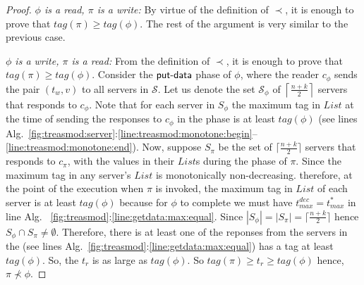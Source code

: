 \begin{proof}
\emph{ $\phi$ is a read, $\pi$ is a write:}
By virtue of the definition of $\prec$, it is enough to prove that $tag(\pi) \geq tag(\phi)$.  The rest of the argument is very similar to the previous case.

\emph{ $\phi$ is a write, $\pi$ is a read:}
From  the definition of $\prec$, it is enough to prove that $tag(\pi) \geq tag(\phi)$. Consider the $\act{put-data}$ phase of $\phi$, where the reader $c_{\phi}$ sends the pair $(t_w, v)$ to all 
servers in $\mathcal{S}$. Let us denote the  set $\mathcal{S}_{\phi}$ of $\left\lceil \frac{n+k}{2} \right\rceil$ servers  that responds to $c_{\phi}$.  Note that for each server in $S_{\phi}$ the maximum tag in $List$ at the time of 
sending the responses to $c_{\phi}$ in the   phase is at least $tag(\phi)$ 
(see  lines 
Alg.~\ref{fig:treasmod:server}:\ref{line:treasmod:monotone:begin}--\ref{line:treasmod:monotone:end}). 
%
Now, suppose $S_{\pi}$ be 
the set of $\lceil \frac{n+k}{2} \rceil$ servers that responds to $c_{\pi}$, with the values in their
 $List$s  during the  phase of $\pi$. 
Since the maximum tag in any server's $List$ is monotonically non-decreasing.%
therefore, at the point of the execution when $\pi$ is invoked, the maximum
tag in  $List$ of each server is at least $tag(\phi)$ because for $\phi$ to complete we must have 
$t_{max}^{dec} =  t_{max}^{*}$ in line Alg. ~\ref{fig:treasmod}:\ref{line:getdata:max:equal}.
%
Since $|S_{\phi}| = | S_{\pi}| = \lceil \frac{n+k}{2} \rceil$  hence 
$S_{\phi} \cap S_{\pi} \neq \emptyset $. Therefore, there is at least one of the  reponses from the servers in the 
(see lines Alg.~\ref{fig:treasmod}:\ref{line:getdata:max:equal}) has a tag at least $tag(\phi)$. So, the $t_r$ is as large as  $tag(\phi)$. So $tag(\pi) \geq t_r \geq tag(\phi)$ hence, $\pi \not\prec \phi$.


\end{proof}

